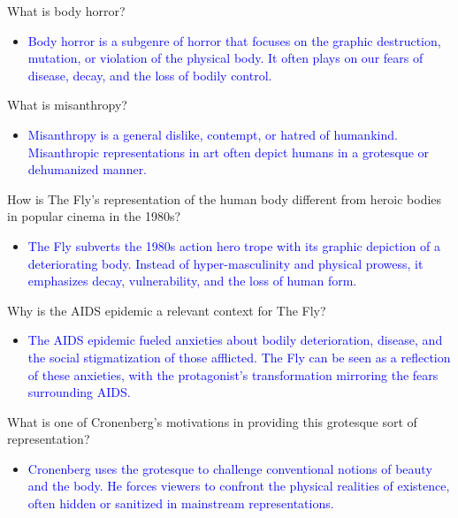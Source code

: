 \documentclass[11pt,fleqn]{book} %
\begin{document}
\begin{exercise}
What is body horror?
\begin{itemize}
    \item \textcolor{blue}{Body horror is a subgenre of horror that focuses on the graphic destruction, mutation, or violation of the physical body. It often plays on our fears of  disease, decay, and the loss of bodily control.}
\end{itemize}
\end{exercise}

\begin{exercise}
What is misanthropy?
\begin{itemize}
    \item \textcolor{blue}{Misanthropy is a general dislike, contempt, or hatred of humankind.  Misanthropic representations in art often depict humans in a grotesque or dehumanized manner.}
\end{itemize}
\end{exercise}

\begin{exercise}
How is The Fly's representation of the human body different from heroic bodies in popular cinema in the 1980s?
\begin{itemize}
    \item \textcolor{blue}{The Fly subverts the 1980s action hero trope with its graphic depiction of a deteriorating body. Instead of hyper-masculinity and physical prowess, it emphasizes decay, vulnerability, and the loss of human form.}
\end{itemize}
\end{exercise}

\begin{exercise}
Why is the AIDS epidemic a relevant context for The Fly?
\begin{itemize}
    \item \textcolor{blue}{The AIDS epidemic fueled anxieties about bodily deterioration, disease, and the social stigmatization of those afflicted. The Fly can be seen as a reflection of these anxieties, with the protagonist's transformation mirroring the fears surrounding AIDS. }
\end{itemize}
\end{exercise}

\begin{exercise}
What is one of Cronenberg's motivations in providing this grotesque sort of representation?
\begin{itemize}
    \item \textcolor{blue}{Cronenberg uses the grotesque to challenge conventional notions of beauty and the body. He forces viewers to confront the physical realities of existence, often hidden or sanitized in mainstream representations. }
\end{itemize}
\end{exercise}
\end{document}
